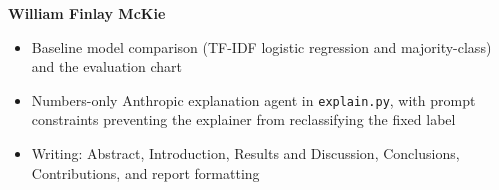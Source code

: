\documentclass[10pt,twocolumn,letterpaper]{article}
\begin{document}
\noindent\textbf{William Finlay McKie}
\begin{itemize}
  \item Baseline model comparison (TF-IDF logistic regression and
        majority-class) and the evaluation chart
  \item Numbers-only Anthropic explanation agent in
        \texttt{explain.py}, with prompt constraints preventing the
        explainer from reclassifying the fixed label
  \item Writing: Abstract, Introduction, Results and Discussion,
        Conclusions, Contributions, and report formatting
\end{itemize}

{\small


}
\end{document}
